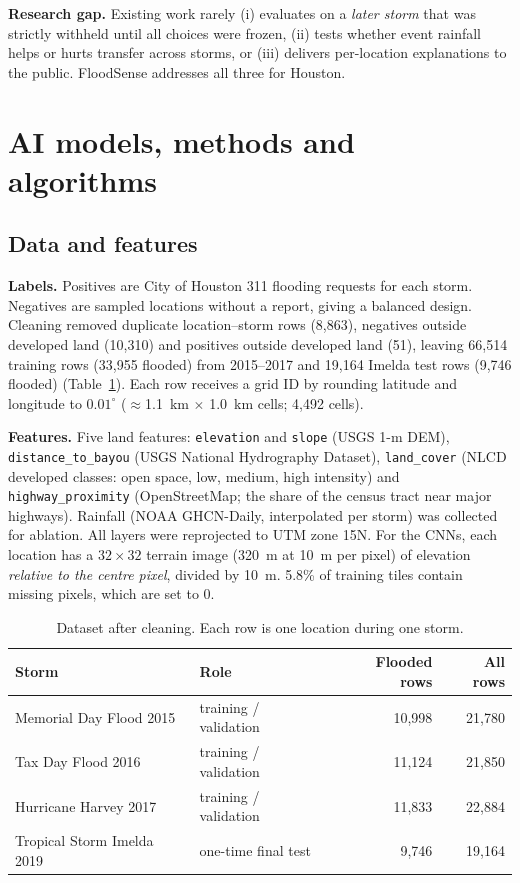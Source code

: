 \documentclass{article}
\begin{document}
\textbf{Research gap.} Existing work rarely (i) evaluates on a \emph{later storm} that was strictly withheld until all choices were frozen, (ii) tests whether event rainfall helps or hurts transfer across storms, or (iii) delivers per-location explanations to the public. FloodSense addresses all three for Houston.

\section{AI models, methods and algorithms}
\subsection{Data and features}
\textbf{Labels.} Positives are City of Houston 311 flooding requests for each storm. Negatives are sampled locations without a report, giving a balanced design. Cleaning removed duplicate location--storm rows (8,863), negatives outside developed land (10,310) and positives outside developed land (51), leaving 66,514 training rows (33,955 flooded) from 2015--2017 and 19,164 Imelda test rows (9,746 flooded) (Table~\ref{tab:data}). Each row receives a grid ID by rounding latitude and longitude to $0.01^\circ$ ($\approx$1.1~km $\times$ 1.0~km cells; 4,492 cells).

\textbf{Features.} Five land features: \texttt{elevation} and \texttt{slope} (USGS 1-m DEM), \texttt{distance\_to\_bayou} (USGS National Hydrography Dataset), \texttt{land\_cover} (NLCD developed classes: open space, low, medium, high intensity) and \texttt{highway\_proximity} (OpenStreetMap; the share of the census tract near major highways). Rainfall (NOAA GHCN-Daily, interpolated per storm) was collected for ablation. All layers were reprojected to UTM zone 15N. For the CNNs, each location has a $32\times32$ terrain image (320~m at 10~m per pixel) of elevation \emph{relative to the centre pixel}, divided by 10~m. 5.8\% of training tiles contain missing pixels, which are set to 0.

\begin{table}[t]
\centering\small
\caption{Dataset after cleaning. Each row is one location during one storm.}
\label{tab:data}
\begin{tabular}{llrr}
\toprule
Storm & Role & Flooded rows & All rows \\
\midrule
Memorial Day Flood 2015 & training / validation & 10,998 & 21,780 \\
Tax Day Flood 2016 & training / validation & 11,124 & 21,850 \\
Hurricane Harvey 2017 & training / validation & 11,833 & 22,884 \\
Tropical Storm Imelda 2019 & one-time final test & 9,746 & 19,164 \\
\bottomrule
\end{tabular}
\end{table}
\end{document}

